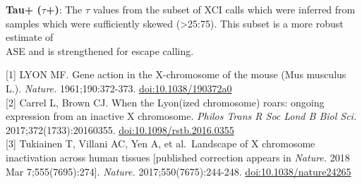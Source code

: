 \documentclass[
]{article}
\begin{document}
\textbf{Tau+ (\(\tau\)+)}: The \(\tau\) values from the subset of XCI
calls which were inferred from\\
samples which were sufficiently skewed (\textgreater25:75). This subset
is a more robust estimate of\\
ASE and is strengthened for escape calling.

{[}1{]} LYON MF. Gene action in the X-chromosome of the mouse (Mus
musculus L.). \emph{Nature.} 1961;190:372-373.
\href{https://www.nature.com/articles/190372a0}{doi:10.1038/190372a0}\\
{[}2{]} Carrel L, Brown CJ. When the Lyon(ized chromosome) roars:
ongoing expression from an inactive X chromosome. \emph{Philos Trans R
Soc Lond B Biol Sci.} 2017;372(1733):20160355.
\href{https://royalsocietypublishing.org/doi/10.1098/rstb.2016.0355}{doi:10.1098/rstb.2016.0355}\\
{[}3{]} Tukiainen T, Villani AC, Yen A, et al.~Landscape of X chromosome
inactivation across human tissues {[}published correction appears in
\emph{Nature.} 2018 Mar 7;555(7695):274{]}. \emph{Nature.}
2017;550(7675):244-248.
\href{https://doi.org/10.1038/nature24265}{doi:10.1038/nature24265}
\end{document}
